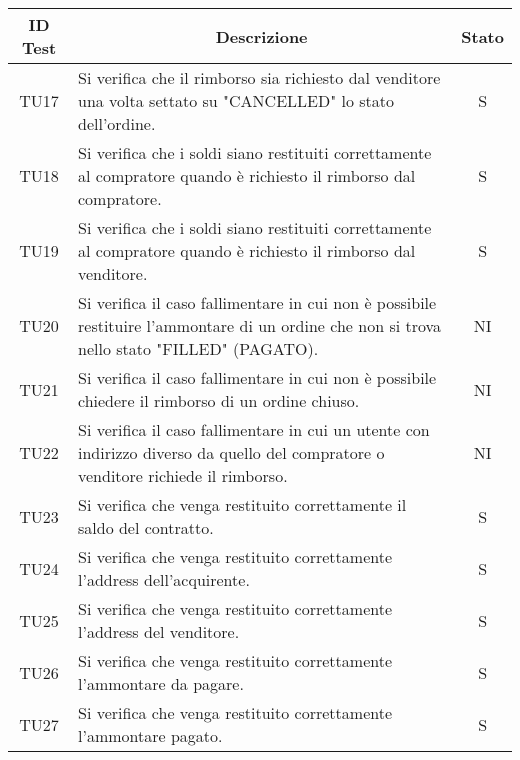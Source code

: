 \begin{table}[H]
  \centering
  \renewcommand{\arraystretch}{1.8}
  \begin{tabular}{c|p{10cm}|c}
    \rowcolor[HTML]{125E28}
    \color[HTML]{FFFFFF}\textbf{ID Test}
         & \multicolumn{1}{c}{\color[HTML]{FFFFFF}\textbf{Descrizione}}
         & \color[HTML]{FFFFFF}\textbf{Stato}                                                                                                               \\
    \hline
    TU17 & Si verifica che il rimborso sia richiesto dal venditore una volta settato su "CANCELLED" lo stato dell'ordine.                              & S  \\
    TU18 & Si verifica che i soldi siano restituiti correttamente al compratore quando è richiesto il rimborso dal compratore.                        & S  \\
    TU19 & Si verifica che i soldi siano restituiti correttamente al compratore quando è richiesto il rimborso dal venditore.                           & S  \\
    TU20 & Si verifica il caso fallimentare in cui non è possibile restituire l'ammontare di un ordine che non si trova nello stato "FILLED" (PAGATO). & NI \\
    TU21 & Si verifica il caso fallimentare in cui non è possibile chiedere il rimborso di un ordine chiuso.                                           & NI \\
    TU22 & Si verifica il caso fallimentare in cui un utente con indirizzo diverso da quello del compratore o venditore richiede il rimborso.          & NI \\
    TU23 & Si verifica che venga restituito correttamente il saldo del contratto.                                                                      & S  \\
    TU24 & Si verifica che venga restituito correttamente l'address dell'acquirente.                                                                   & S  \\
    TU25 & Si verifica che venga restituito correttamente l'address del venditore.                                                                     & S  \\
    TU26 & Si verifica che venga restituito correttamente l'ammontare da pagare.                                                                       & S  \\
    TU27 & Si verifica che venga restituito correttamente l'ammontare pagato.                                                                          & S  \\

\end{tabular}
\end{table}
